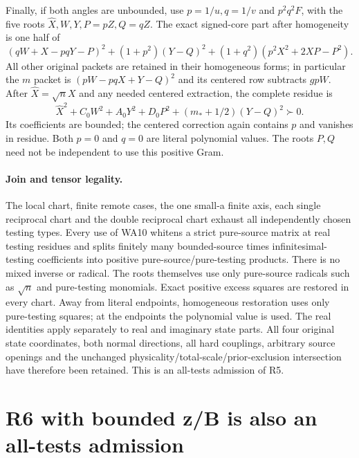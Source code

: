 Finally, if both angles are unbounded, use $p=1/u,q=1/v$ and
$p^2q^2F$, with the five roots $\widehat X,W,Y,P=pZ,Q=qZ$.
The exact signed-core part after homogeneity is one half of
\[
 (qW+X-pqY-P)^2+(1+p^2)(Y-Q)^2
                    +(1+q^2)(p^2X^2+2XP-P^2).       \tag{R5.16}
\]
All other original packets are retained in their homogeneous forms;
in particular the $m$ packet is $(pW-pqX+Y-Q)^2$ and its centered
row subtracts $gpW$. After $\widehat X=\sqrt nX$ and any needed
centered extraction, the complete residue is
\[
 \widehat X^2+C_0W^2+A_0Y^2+D_0P^2
                                  +(m_*+1/2)(Y-Q)^2\succ0.       \tag{R5.17}
\]
Its coefficients are bounded; the centered correction again contains
$p$ and vanishes in residue. Both $p=0$ and $q=0$ are literal
polynomial values. The roots $P,Q$ need not be independent to use
this positive Gram.

\paragraph{Join and tensor legality.}
The local chart, finite remote cases, the one small-a finite axis,
each single reciprocal chart and the double reciprocal chart exhaust
all independently chosen testing types. Every use of WA10 whitens a
strict pure-source matrix at real testing residues and splits finitely
many bounded-source times infinitesimal-testing coefficients into
positive pure-source/pure-testing products. There is no mixed inverse
or radical. The roots themselves use only pure-source radicals such
as $\sqrt n$ and pure-testing monomials. Exact positive excess squares
are restored in every chart. Away from literal endpoints, homogeneous
restoration uses only pure-testing squares; at the endpoints the
polynomial value is used. The real identities apply separately to real
and imaginary state parts. All four original state coordinates, both
normal directions, all hard couplings, arbitrary source openings and
the unchanged physicality/total-scale/prior-exclusion intersection
have therefore been retained. This is an all-tests admission of R5.


\section{\texorpdfstring{R6 with bounded z/B is also an all-tests admission}{R6 with bounded z/B is also an all-tests admission}}
\label{component:pd5fa361b4623}

